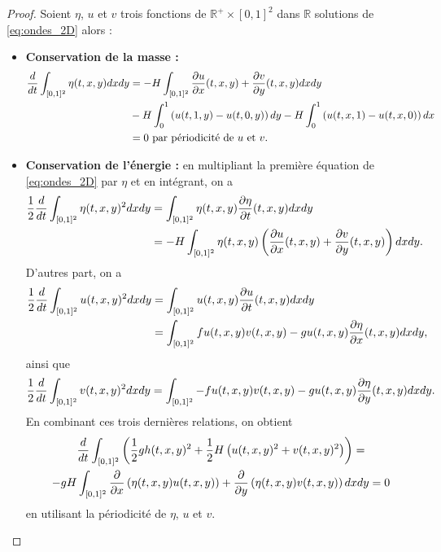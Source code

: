 \begin{proof}
Soient $\eta$, $u$ et $v$ trois fonctions de $\mathbb{R}^+ \times [0,1]^2$ dans $\mathbb{R}$ solutions de \eqref{eq:ondes_2D} alors :
\begin{itemize}
\item \textbf{Conservation de la masse :}
\begin{align*}
\dfrac{d}{dt} \displaystyle\int_{[0,1]^2} \eta(t,x,y)dxdy & = - H \displaystyle\int_{[0,1]^2} \dfrac{\partial u}{\partial x}(t,x,y) + \dfrac{\partial v}{\partial y}(t,x,y) dx dy \\
	& - H \displaystyle\int_0^1 \left( u(t,1,y) - u(t,0,y) \right)dy  - H \displaystyle\int_0^1 \left( u(t,x,1) - u(t,x,0) \right)dx \\
	& = 0 \text{ par périodicité de } u \text{ et } v. 
\end{align*}

\item \textbf{Conservation de l'énergie :} en multipliant la première équation de \eqref{eq:ondes_2D} par $\eta$ et en intégrant, on a 
\begin{align*}
\dfrac{1}{2} \dfrac{d}{dt} \displaystyle\int_{[0,1]^2} \eta(t,x,y)^2 dx dy & = \displaystyle\int_{[0,1]^2} \eta(t,x,y) \dfrac{\partial \eta}{\partial t}(t,x,y) dx dy \\
	& = - H \displaystyle\int_{[0,1]^2} \eta(t,x,y) \left( \dfrac{\partial u}{\partial x}(t,x,y) + \dfrac{\partial v}{\partial y}(t,x,y) \right) dx dy.
\end{align*}
D'autres part, on a 
\begin{align*}
\dfrac{1}{2} \dfrac{d}{dt} \displaystyle\int_{[0,1]^2} u(t,x,y)^2 dx dy & = \displaystyle\int_{[0,1]^2} u(t,x,y) \dfrac{\partial u}{\partial t}(t,x,y) dx dy \\
& = \displaystyle\int_{[0,1]^2} f u(t,x,y) v(t,x,y) - g u(t,x,y) \dfrac{\partial \eta}{\partial x}(t,x,y) dx dy,
\end{align*}
ainsi que 
\begin{equation*}
\dfrac{1}{2} \dfrac{d}{dt} \displaystyle\int_{[0,1]^2} v(t,x,y)^2 dx dy =  \displaystyle\int_{[0,1]^2}  - f u(t,x,y) v(t,x,y) - g u(t,x,y) \dfrac{\partial \eta}{\partial y}(t,x,y) dx dy.
\end{equation*}
En combinant ces trois dernières relations, on obtient
\begin{multline*}
\dfrac{d}{dt} \displaystyle\int_{[0,1]^2} \left( \dfrac{1}{2} g h(t,x,y)^2 + \dfrac{1}{2} H \left( u(t,x,y)^2 + v(t,x,y)^2 \right) \right) = \\
- g H \displaystyle\int_{[0,1]^2} \dfrac{\partial}{\partial x} \left( \eta(t,x,y) u (t,x,y) \right) +  \dfrac{\partial}{\partial y} \left( \eta(t,x,y) v (t,x,y) \right) dx dy
= 0
\end{multline*}
en utilisant la périodicité de $\eta$, $u$ et $v$.
\end{itemize}
\end{proof}








